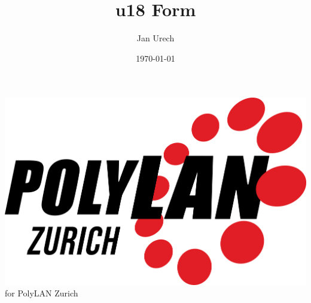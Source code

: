 \documentclass{article}
\title{u18 Form}
\author{Jan Urech}
\date{\today}
\begin{document}
\makeatletter
\includegraphics[scale=0.0255]{img/PolyLAN_Zurich_black.png}  
\hspace{0.5cm}
\LARGE \@title  
\hspace{0.1cm}
for PolyLAN Zurich\\ \normalsize
\vspace{0.5cm}
\raggedright
\end{document}
